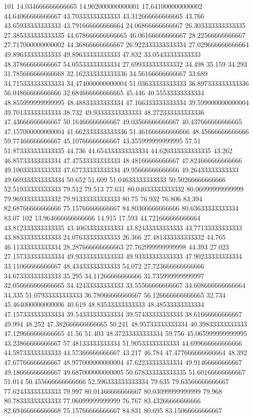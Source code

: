 101 14.034666666666665 14.902000000000001 17.641000000000002 44.64066666666667 43.70333333333333 43.312666666666665 43.766 43.65933333333333 43.791666666666664 24.06866666666667 26.303333333333335 27.385333333333335 44.678666666666665 46.06166666666667 28.22566666666667 27.717000000000002 44.36866666666667 26.922333333333334 27.029666666666664 49.89633333333333 49.89633333333333 47.832 33.05433333333333 48.37866666666667 54.05533333333334 27.699333333333332 34.498 35.159 34.293 31.785666666666668 32.162333333333336 34.56166666666667 33.689 34.715333333333334 34.474000000000004 51.03633333333333 36.897333333333336 56.04866666666666 32.684666666666665 45.446 40.55533333333334 48.855999999999995 48.48833333333334 47.166333333333334 39.599000000000004 39.70133333333333 38.732 49.93333333333333 48.272333333333336 47.43666666666667 50.16466666666667 49.03566666666667 40.437666666666665 47.157000000000004 41.662333333333336 51.461666666666666 48.45666666666666 59.77466666666667 45.10766666666667 43.355999999999995 57.51 51.873333333333335 44.736 44.654333333333334 44.620333333333335 43.262 46.85733333333334 47.47533333333333 48.48166666666667 47.824666666666666 49.10033333333333 47.67733333333334 49.95666666666666 49.26433333333333 49.669333333333334 50.652 51.609 51.04633333333333 50.50266666666666 52.51933333333333 79.512 79.513 77.631 80.04033333333332 80.06099999999999 79.96933333333332 79.91333333333333 80.75 76.932 76.806 83.394 82.68766666666666 75.15766666666667 84.80366666666666 80.63633333333334 83.07
102 13.964666666666666 14.915 17.593 44.721666666666664 43.812333333333335 43.40633333333333 43.82433333333333 43.77133333333333 43.88333333333333 24.07633333333333 26.366 27.481333333333332 44.765 46.11333333333334 28.287666666666663 27.762999999999998 44.393 27.023 27.157333333333334 49.93333333333333 49.93333333333333 47.90233333333334 33.11066666666667 48.43433333333333 54.072 27.723666666666666 34.67333333333333 35.295 34.11266666666666 31.735999999999997 32.056666666666665 34.42433333333333 33.55566666666667 34.608666666666664 34.335 51.07933333333333 36.78066666666667 56.126666666666665 32.734 45.464000000000006 40.619 48.83533333333333 48.48533333333334 47.157333333333334 39.54333333333334 39.57433333333333 38.61666666666667 49.994 48.252 47.382666666666665 50.241 48.95733333333334 40.39833333333333 47.129666666666665 41.56 51.403 48.37233333333334 59.756 45.065999999999995 43.23866666666667 57.48133333333334 51.90533333333333 44.699666666666666 44.58733333333333 44.57366666666667 43.217 46.784 47.477666666666664 48.392 47.67766666666667 48.977000000000004 47.62233333333334 49.91466666666667 49.18666666666667 49.687000000000005 50.678333333333335 51.60166666666667 51.014 50.455666666666666 52.596333333333334 79.635 79.63566666666667 77.62433333333333 79.997 80.01466666666667 80.03099999999999 79.968 80.78333333333333 77.06099999999999 76.767 83.43266666666666 82.69466666666668 75.15766666666667 84.831 80.695 83.15066666666667
